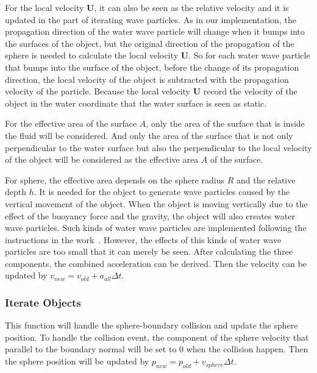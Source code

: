 \documentclass[acmtog]{acmart}
\begin{document}
For the local velocity $\mathbf{U}$, it can also be seen as the relative velocity and it is updated in the part of iterating wave particles. 
As in our implementation, the propagation direction of the water wave particle will change when it bumps into the surfaces of the object, but the original direction of the propagation of the sphere is needed to calculate the local velocity $\mathbf{U}$. 
So for each water wave particle that bumps into the surface of the object, before the change of its propagation direction, the local velocity of the object is subtracted with the propagation velocity of the particle. 
Because the local velocity $\mathbf{U}$ record the velocity of the object in the water coordinate that the water surface is seen as static. 

For the effective area of the surface $A$, only the area of the surface that is inside the fluid will be considered. 
And only the area of the surface that is not only perpendicular to the water surface but also the perpendicular to the local velocity of the object will be considered as the effective area $A$ of the surface. 

For sphere, the effective area depends on the sphere radius $R$ and the relative depth $h$. 
It is needed for the object to generate wave particles caused by the vertical movement of the object. 
When the object is moving vertically due to the effect of the buoyancy force and the gravity, the object will also creates water wave particles. 
Such kinds of water wave particles are implemented following the instructions in the work~\cite{yuksel2007wave}. 
However, the effects of this kinds of water wave particles are too small that it can merely be seen.  
After calculating the three components, the combined acceleration can be derived. Then the velocity can be updated by $v_{new} = v_{old} + a_{all} \Delta t$. 
\subsubsection{Iterate Objects}
This function will handle the sphere-boundary collision and update the sphere position. To handle the collision event, the component of the sphere velocity that parallel to the boundary normal will be set to $0$ when the collision happen.
Then the sphere position will be updated by $p_{new} = p_{old} + v_{sphere} \Delta t$.
\end{document}
